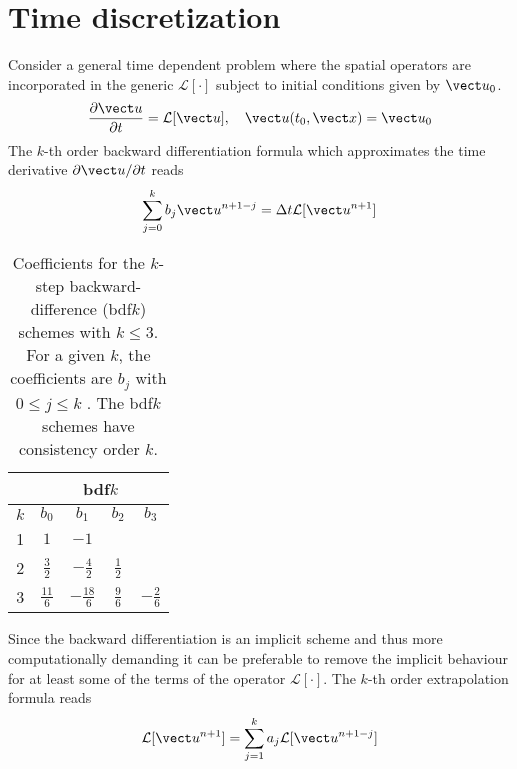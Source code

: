 
\section{Time discretization}
Consider a general time dependent problem where the spatial operators are incorporated in the generic $\mathcal{L}[\cdot]$ subject to initial conditions given by $\vect u_0$. 
\begin{equation}
\frac{\partial \vect u}{\partial t}=\mathcal{L}[\vect u], \quad \vect u(t_0,\vect x)=\vect u_0
\end{equation}\label{eq:generic}
The $k$-th order backward differentiation formula which approximates the time derivative $\partial \vect u/\partial t$ reads
\begin{equation}
\sum\limits_{j=0}^k b_j \vect u^{n+1-j}  =\Delta t \mathcal{L}[\vect u^{n+1}]\label{eq:bdf}
\end{equation}


\begin{table}[tb!]
\caption[{\sc bdf}$k$ Coefficients]
{Coefficients for the $k$-step backward-difference ({\sc bdf}$k$) schemes 
with $k \leq 3$. For a given $k$, the coefficients are $b_j$ with $0 \leq j \leq k$ . The {\sc bdf}$k$ schemes have consistency order $k$.} 
\label{tab:bdms}
\begin{center}
\begin{tabular}{|c||c|c|c|c|}  \hline\hline 
  & \multicolumn{4}{c|}{{\sc bdf}$k$} \\ \hline\hline  
  $k$ &  $b_0$ & $b_1$ & $b_2$ & $b_3$  \\ \hline
  1   &  $1$ & $-1$ &       &         \\ \hline
  2  & $ \frac{3}{2}$ & $  -\frac{4}{2}$ & $  \frac{1}{2}$ &         \\ \hline
  3  & $ \frac{11}{6}$ & $ -\frac{18}{6}$ & $  \frac{9}{6}$ & $  -\frac{2}{6}$     \\ \hline\hline
\end{tabular}
\end{center}
\end{table}

Since the backward differentiation is an implicit scheme and thus more computationally demanding it can be preferable to remove the implicit behaviour for at least some of the terms of the operator $\mathcal{L}[\cdot]$. 
The $k$-th order extrapolation formula reads
\begin{equation}
\mathcal{L}[\vect u^{n+1}]=\sum\limits_{j=1}^k a_j \mathcal{L}[\vect u^{n+1-j}]\label{eq:abf}
\end{equation}

